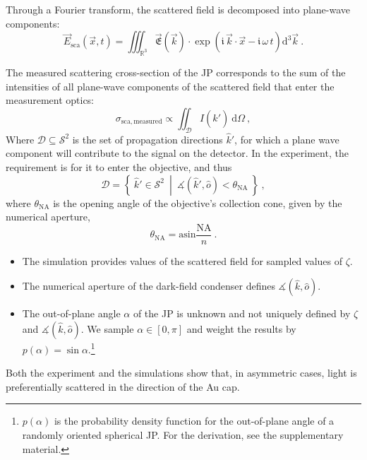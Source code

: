 \documentclass[10pt]{article}
\begin{document}
\begin{multicols}{2}
Through a Fourier transform, the scattered field is decomposed into plane-wave components:
$$
    \vec{E}_\mathrm{sca}(\vec{x},t) = \iiint_{\mathds{R}^3} \vec{\mathfrak{E}}(\vec{k}) \cdot \exp\!\left( \mathfrak{i}\,\vec{k}\cdot\vec{x} - \mathfrak{i}\,\omega\,t\right) \mathrm{d}^3 \vec{k} \ .
$$


The measured scattering cross-section of the JP corresponds to the sum of the intensities of all plane-wave components of the scattered field that enter the measurement optics:
$$\sigma_\mathrm{sca,measured} \propto \iint_{\mathcal{D}} I\left( \hat{k}' \right) ~\mathrm{d}\Omega\ ,$$
Where $\mathcal{D} \subseteq \mathcal{S}^2$ is the set of propagation directions $\hat{k}'$, for which a plane wave component will contribute to the signal on the detector. 
In the experiment, the requirement is for it to enter the objective, and thus
$$
    \mathcal{D} = \left\lbrace\ \hat{k}' \in \mathcal{S}^2\ \middle\vert\ \measuredangle\!\left( \hat{k}', \hat{o}\right) < \theta_\mathrm{NA}\ \right\rbrace
    \ ,
$$
where $\theta_\mathrm{NA}$ is the opening angle of the objective's collection cone, given by the numerical aperture,
$$\theta_\mathrm{NA} = \mathrm{asin}\frac{\mathrm{NA}}{n} \ .$$

\begin{itemize}
    \item The simulation provides values of the scattered field for sampled values of $\zeta$.
    \item The numerical aperture of the dark-field condenser defines $\measuredangle(\hat{k},\hat{o})$.
    \item The out-of-plane angle $\alpha$ of the JP is unknown and not uniquely defined by $\zeta$ and $\measuredangle(\hat{k},\hat{o})$. We sample $\alpha\in\left[0,\pi\right]$ and weight the results by $p(\alpha) = \sin\alpha$.\footnote{$p(\alpha)$ is the probability density function for the out-of-plane angle of a randomly oriented spherical JP. For the derivation, see the supplementary material.}
\end{itemize}


Both the experiment and the simulations show that, in asymmetric cases, light is preferentially scattered in the direction of the Au cap.






\end{multicols}
\end{document}
